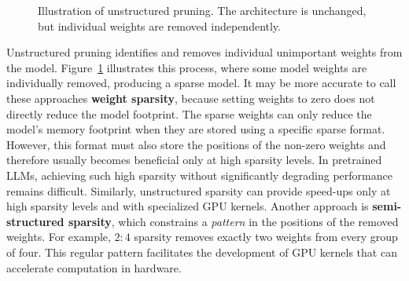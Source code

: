 \begin{figure}[!ht]
    \caption{Illustration of unstructured pruning. The architecture is unchanged, but individual weights are removed independently.}
    \label{fig:unstructured}
\end{figure}
Unstructured pruning identifies and removes individual unimportant weights from the model. 
Figure~\ref{fig:unstructured} illustrates this process, where some model weights are individually removed, 
producing a sparse model.
It may be more accurate to call these approaches \textbf{weight sparsity}, 
because setting weights to zero does not directly reduce the model footprint. 
The sparse weights can only reduce the model's memory footprint when they are stored 
using a specific sparse format. However, this format must also store the positions of 
the non-zero weights and therefore usually becomes beneficial only at high sparsity levels. 
In pretrained LLMs, achieving such high sparsity without significantly 
degrading performance remains difficult. Similarly, unstructured sparsity can provide 
speed-ups only at high sparsity levels and with specialized GPU kernels.
Another approach is \textbf{semi-structured sparsity}, which constrains a \textit{pattern} 
in the positions of the removed weights. For example, $2{:}4$ sparsity removes exactly
two weights from every group of four. This regular pattern facilitates
the development of GPU kernels that can accelerate computation in hardware. 

